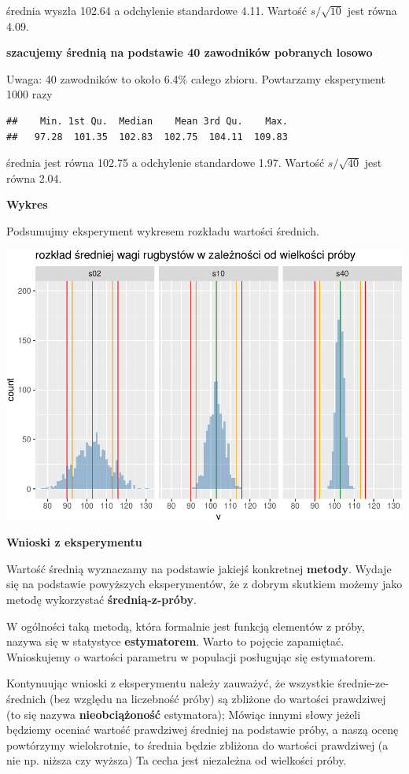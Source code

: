 \documentclass[
  openany]{book}
\begin{document}
średnia wyszła 102.64 a odchylenie standardowe
4.11.
Wartość \(s/\sqrt{10}\) jest równa 4.09.

\textbf{szacujemy średnią na podstawie 40 zawodników pobranych losowo}

Uwaga: 40 zawodników to około 6.4\%
całego zbioru.
Powtarzamy eksperyment 1000 razy

\begin{verbatim}
##    Min. 1st Qu.  Median    Mean 3rd Qu.    Max. 
##   97.28  101.35  102.83  102.75  104.11  109.83
\end{verbatim}

średnia jest równa 102.75 a odchylenie standardowe 1.97.
Wartość \(s/\sqrt{40}\) jest równa 2.04.

\textbf{Wykres}

Podsumujmy eksperyment wykresem rozkładu wartości średnich.

\includegraphics{_main_files/figure-latex/unnamed-chunk-26-1.pdf}

\textbf{Wnioski z eksperymentu}

Wartość średnią wyznaczamy na podstawie jakiejś konkretnej \textbf{metody}.
Wydaje się na podstawie powyższych eksperymentów, że z dobrym skutkiem
możemy jako metodę wykorzystać \textbf{średnią-z-próby}.

W ogólności taką metodą, która formalnie jest funkcją elementów z próby, nazywa się
w statystyce \textbf{estymatorem}. Warto to pojęcie zapamiętać. Wnioskujemy
o wartości parametru w populacji posługując się estymatorem.

Kontynuując wnioski z eksperymentu należy zauważyć, że
wszystkie średnie-ze-średnich (bez względu na liczebność próby) są zbliżone do wartości
prawdziwej (to się nazywa \textbf{nieobciążoność} estymatora);
Mówiąc innymi słowy jeżeli będziemy oceniać wartość prawdziwej średniej na podstawie próby,
a naszą ocenę powtórzymy wielokrotnie,
to średnia będzie zbliżona do wartości prawdziwej (a nie np. niższa czy wyższa)
Ta cecha jest niezależna od wielkości próby.
\end{document}
